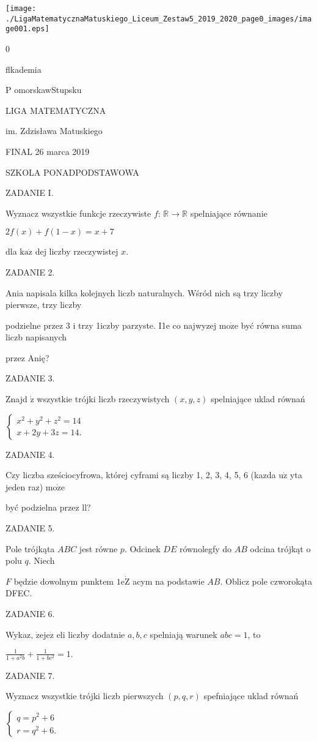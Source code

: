 \documentclass[a4paper,12pt]{article}
\begin{document}
\begin{center}
\texttt{[image: ./LigaMatematycznaMatuskiego\_Liceum\_Zestaw5\_2019\_2020\_page0\_images/image001.eps]}
\end{center}
0

flkademia

P omorskawStupsku

LIGA MATEMATYCZNA

im. Zdzisława Matuskiego

FINAL 26 marca 2019

SZKOLA PONADPODSTAWOWA

ZADANIE I.

Wyznacz wszystkie funkcje rzeczywiste $f$: $\mathbb{R}\rightarrow \mathbb{R}$ spelniające równanie

$2f(x)+f(1-x)=x+7$

dla $\mathrm{k}\mathrm{a}\dot{\mathrm{z}}$ dej liczby rzeczywistej $x.$

ZADANIE 2.

Ania napisala kilka kolejnych liczb naturalnych. Wśród nich są trzy liczby pierwsze, trzy liczby

podzielne przez 3 i trzy 1iczby parzyste. I1e co najwyzej $\mathrm{m}\mathrm{o}\dot{\mathrm{z}}\mathrm{e}$ być równa suma liczb napisanych

przez Anię?

ZADANIE 3.

Znajd $\acute{\mathrm{z}}$ wszystkie trójki liczb rzeczywistych $(x,y,z)$ spelniające uklad równań

$\left\{\begin{array}{l}
x^{2}+y^{2}+z^{2}=14\\
x+2y+3z=14.
\end{array}\right.$

ZADANIE 4.

Czy liczba sześciocyfrowa, której cyframi są liczby 1, 2, 3, 4, 5, 6 (kazda $\mathrm{u}\dot{\mathrm{z}}$ yta jeden raz) $\mathrm{m}\mathrm{o}\dot{\mathrm{z}}\mathrm{e}$

być podzielna przez ll?

ZADANIE 5.

Pole trójkąta $ABC$ jest równe $p$. Odcinek $DE$ równolegfy do $AB$ odcina trójkąt o polu $q$. Niech

$F$ będzie dowolnym punktem $1\mathrm{e}\dot{\mathrm{Z}}$ acym na podstawie $AB$. Oblicz pole czworokąta DFEC.

ZADANIE 6.

Wykaz, $\dot{\mathrm{z}}\mathrm{e}\mathrm{j}\mathrm{e}\dot{\mathrm{z}}$ eli liczby dodatnie $a, b, c$ spelniają warunek $abc=1$, to

$\displaystyle \frac{1}{1+a^{2}b}+\frac{1}{1+bc^{2}}=1.$

ZADANIE 7.

Wyznacz wszystkie trójki liczb pierwszych $(p,q,r)$ spefniające uklad równań

$\left\{\begin{array}{l}
q=p^{2}+6\\
r=q^{2}+6.
\end{array}\right.$
\end{document}
